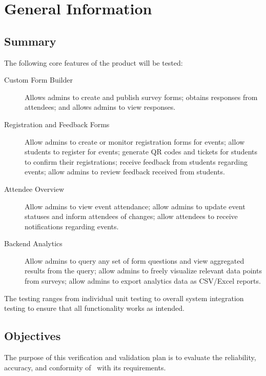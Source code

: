\documentclass[12pt, titlepage]{article}
\begin{document}
\section{General Information}

\subsection{Summary}

The following core features of the product will be tested:

\begin{description}
  \item[Custom Form Builder] Allows admins to create and publish survey forms; obtains responses from attendees; and
    allows admins to view responses.
  \item[Registration and Feedback Forms] Allow admins to create or monitor registration forms for events; allow students
    to register for events; generate QR codes and tickets for students to confirm their registrations; receive feedback
    from students regarding events; allow admins to review feedback received from students.
  \item[Attendee Overview] Allow admins to view event attendance; allow admins to update event statuses and inform
    attendees of changes; allow attendees to receive notifications regarding events.
  \item[Backend Analytics] Allow admins to query any set of form questions and view aggregated results from the query;
    allow admins to freely visualize relevant data points from surveys; allow admins to export analytics data as
    CSV/Excel reports.
\end{description}

\noindent The testing ranges from individual unit testing to overall system integration testing to ensure that all functionality
works as intended.
\subsection{Objectives}

The purpose of this verification and validation plan is to evaluate the reliability, accuracy, and conformity of
\teamname~with its requirements.
\end{document}
